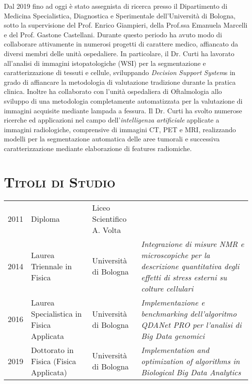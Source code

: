 \documentclass[a4paper,11pt]{article}
\begin{document}
Dal 2019 fino ad oggi è stato assegnista di ricerca presso il Dipartimento di Medicina Specialistica, Diagnostica e Sperimentale dell'Università di Bologna, sotto la supervisione del Prof. Enrico Giampieri, della Prof.ssa Emanuela Marcelli e del Prof. Gastone Castellani.
Durante questo periodo ha avuto modo di collaborare attivamente in numerosi progetti di carattere medico, affiancato da diversi membri delle unità ospedaliere.
In particolare, il Dr. Curti ha lavorato all'analisi di immagini istopatologiche (WSI) per la segmentazione e caratterizzazione di tessuti e cellule, sviluppando \emph{Decision Support System}s in grado di affiancare la metodologia di valutazione tradizione durante la pratica clinica.
Inoltre ha collaborato con l'unità ospedaliera di Oftalmologia allo sviluppo di una metodologia completamente automatizzata per la valutazione di immagini acquisite mediante lampada a fessura.
Il Dr. Curti ha svolto numerose ricerche ed applicazioni nel campo dell'\emph{intelligenza artificiale} applicate a immagini radiologiche, comprensive di immagini CT, PET e MRI, realizzando modelli per la segmentazione automatica delle aree tumorali e successiva caratterizzazione mediante elaborazione di features radiomiche.


\newpage

\section*{\scshape{Titoli di Studio}}

\begin{tabular}{lp{4cm}lp{8cm}}
  2011 & Diploma                                  & Liceo Scientifico A. Volta & \\
  2014 & Laurea Triennale in Fisica               & Università di Bologna      & \emph{Integrazione di misure NMR e microscopiche per la descrizione quantitativa degli effetti di stress esterni su colture cellulari} \\
  2016 & Laurea Specialistica in Fisica Applicata & Università di Bologna      & \emph{Implementazione e benchmarking dell'algoritmo QDANet PRO per l'analisi di Big Data genomici} \\
  2019 & Dottorato in Fisica (Fisica Applicata)   & Università di Bologna      & \emph{Implementation and optimization of algorithms in Biological Big Data Analytics} \\
\end{tabular}



\vspace*{0.5cm}
\end{document}
